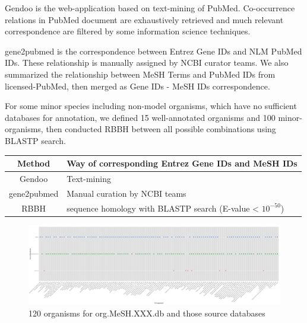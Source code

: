 \documentclass[11pt]{article}
\begin{document}
Gendoo is the web-application based on text-mining of PubMed. Co-occurrence relations in PubMed document are exhaustively retrieved and much relevant correspondence are filtered by some information science techniques.

gene2pubmed is the correspondence between Entrez Gene IDs and NLM PubMed IDs. These relationship is manually assigned by NCBI curator teams. We also summarized the relationship between MeSH Terms and PubMed IDs from licensed-PubMed, then merged as Gene IDs - MeSH IDs correspondence.

For some minor species including non-model organisms, which have no sufficient databases for annotation, we defined 15 well-annotated organisms and 100 minor-organisms, then conducted RBBH between all possible combinations using BLASTP search.
\begin{center}
  \begin{table}[htbp]
    \begin{tabular}{|c|l|}\hline
      Method & Way of corresponding Entrez Gene IDs and MeSH IDs \\ \hline \hline
      Gendoo & Text-mining \\ \hline
      gene2pubmed & Manual curation by NCBI teams \\ \hline
      RBBH & sequence homology with BLASTP search (E-value < $10^{-50}$) \\ \hline
\end{tabular}
  \end{table}
\end{center}

\begin{figure}[ht]
\centering
\includegraphics[width=\linewidth,angle=270]{fig3.png}
\caption{120 organisms for org.MeSH.XXX.db and those source databases}
\label{fig3}
\end{figure}
\clearpage
\end{document}
